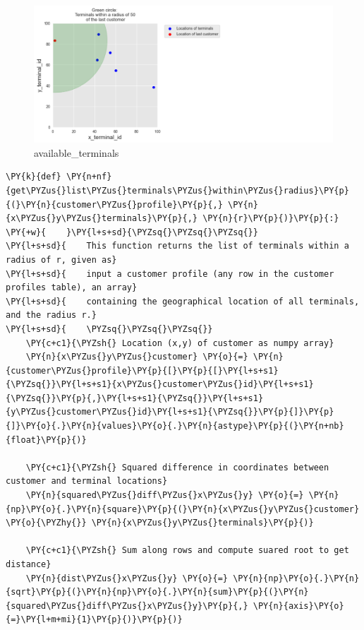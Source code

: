 \begin{figure}
\centering
\includegraphics{images/available_terminals.png}
\caption{available\_terminals}
\end{figure}

    \begin{tcolorbox}[breakable, size=fbox, boxrule=1pt, pad at break*=1mm,colback=cellbackground, colframe=cellborder]
\begin{Verbatim}[commandchars=\\\{\}]
\PY{k}{def} \PY{n+nf}{get\PYZus{}list\PYZus{}terminals\PYZus{}within\PYZus{}radius}\PY{p}{(}\PY{n}{customer\PYZus{}profile}\PY{p}{,} \PY{n}{x\PYZus{}y\PYZus{}terminals}\PY{p}{,} \PY{n}{r}\PY{p}{)}\PY{p}{:}
\PY{+w}{    }\PY{l+s+sd}{\PYZsq{}\PYZsq{}\PYZsq{}}
\PY{l+s+sd}{    This function returns the list of terminals within a radius of r, given as}
\PY{l+s+sd}{    input a customer profile (any row in the customer profiles table), an array}
\PY{l+s+sd}{    containing the geographical location of all terminals, and the radius r.}
\PY{l+s+sd}{    \PYZsq{}\PYZsq{}\PYZsq{}}
    \PY{c+c1}{\PYZsh{} Location (x,y) of customer as numpy array}
    \PY{n}{x\PYZus{}y\PYZus{}customer} \PY{o}{=} \PY{n}{customer\PYZus{}profile}\PY{p}{[}\PY{p}{[}\PY{l+s+s1}{\PYZsq{}}\PY{l+s+s1}{x\PYZus{}customer\PYZus{}id}\PY{l+s+s1}{\PYZsq{}}\PY{p}{,}\PY{l+s+s1}{\PYZsq{}}\PY{l+s+s1}{y\PYZus{}customer\PYZus{}id}\PY{l+s+s1}{\PYZsq{}}\PY{p}{]}\PY{p}{]}\PY{o}{.}\PY{n}{values}\PY{o}{.}\PY{n}{astype}\PY{p}{(}\PY{n+nb}{float}\PY{p}{)}

    \PY{c+c1}{\PYZsh{} Squared difference in coordinates between customer and terminal locations}
    \PY{n}{squared\PYZus{}diff\PYZus{}x\PYZus{}y} \PY{o}{=} \PY{n}{np}\PY{o}{.}\PY{n}{square}\PY{p}{(}\PY{n}{x\PYZus{}y\PYZus{}customer} \PY{o}{\PYZhy{}} \PY{n}{x\PYZus{}y\PYZus{}terminals}\PY{p}{)}

    \PY{c+c1}{\PYZsh{} Sum along rows and compute suared root to get distance}
    \PY{n}{dist\PYZus{}x\PYZus{}y} \PY{o}{=} \PY{n}{np}\PY{o}{.}\PY{n}{sqrt}\PY{p}{(}\PY{n}{np}\PY{o}{.}\PY{n}{sum}\PY{p}{(}\PY{n}{squared\PYZus{}diff\PYZus{}x\PYZus{}y}\PY{p}{,} \PY{n}{axis}\PY{o}{=}\PY{l+m+mi}{1}\PY{p}{)}\PY{p}{)}


\end{Verbatim}
\end{tcolorbox}
